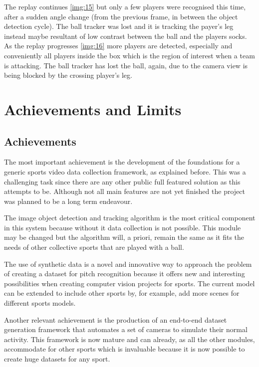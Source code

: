 \documentclass[
    11pt,
    twoside
]{report}
\begin{document}
The replay continues \ref{img:15} but only a few players were recognised this time, after a sudden angle change (from the previous frame, in between the object detection cycle). The ball tracker was lost and it is tracking the payer's leg instead maybe resultant of low contrast between the ball and the players socks. As the replay progresses \ref{img:16} more players are detected, especially and conveniently all players inside the box which is the region of interest when a team is attacking. The ball tracker has lost the ball, again, due to the camera view is being blocked by the crossing player's leg.





\section{Achievements and Limits}

\subsection{Achievements}


The most important achievement is the development of the foundations for a generic sports video data collection framework, as explained before. This was a challenging task since there are any other public full featured solution as this attempts to be. Although not all main features are not yet finished the project was planned to be a long term endeavour.


The image object detection and tracking algorithm is the most critical component in this system because without it data collection is not possible. This module may be changed but the algorithm will, a priori, remain the same as it fits the needs of other collective sports that are played with a ball.


The use of synthetic data is a novel and innovative way to approach the problem of creating a dataset for pitch recognition because it offers new and interesting possibilities when creating computer vision projects for sports. The current model can be extended to include other sports by, for example, add more scenes for different sports models.


Another relevant achievement is the production of an end-to-end dataset generation framework that automates a set of cameras to simulate their normal activity. This framework is now mature and can already, as all the other modules, accommodate for other sports which is invaluable because it is now possible to create huge datasets for any sport.
\end{document}
